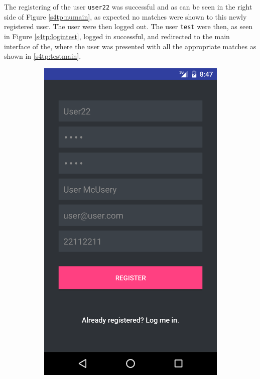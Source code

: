 The registering of the user \texttt{user22} was successful and as can be seen in the right side of Figure \ref{s4tp:numain}, as expected no matches were shown to this newly registered user. 
The user were then logged out.
The user \texttt{test} were then, as seen in Figure \ref{s4tp:logintest}, logged in successful, and redirected to the main interface of the, where the user was presented with all the appropriate matches as shown in \ref{s4tp:testmain}.
\begin{figure}[ht!]
\centering
\begin{subfigure}[b]{0.24\textwidth}
        \includegraphics[width=\textwidth]{figures/s4test/newuser.png}

\end{subfigure}
\end{figure}
